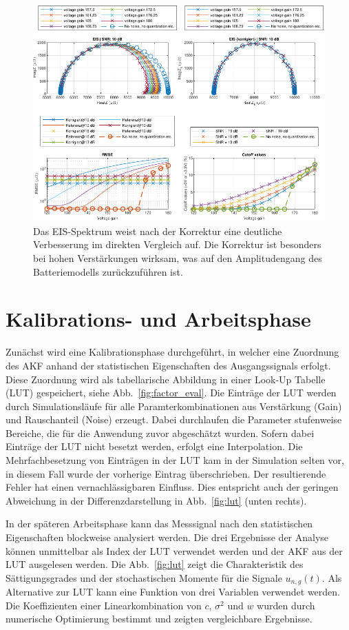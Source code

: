 \begin{figure}[t!]
	\centering
	\includegraphics[width=.9\textwidth]{../img/ergebnisse.pdf}
	\caption{Das EIS-Spektrum weist nach der Korrektur eine deutliche Verbesserung im direkten Vergleich auf. Die Korrektur ist besonders bei hohen Verstärkungen wirksam, was auf den Amplitudengang des Batteriemodells zurückzuführen ist.}
	\label{fig:Ergebnisse} 
\end{figure}

\section{Kalibrations- und Arbeitsphase}

Zunächst wird eine Kalibrationsphase durchgeführt, in welcher eine Zuordnung des AKF anhand der statistischen Eigenschaften des Ausgangssignals erfolgt. Diese Zuordnung wird als tabellarische Abbildung in einer Look-Up Tabelle (LUT) gespeichert, siehe Abb.~\ref{fig:factor_eval}. 
Die Einträge der LUT werden durch Simulationsläufe für alle Paramterkombinationen aus Verstärkung (Gain) und Rauschanteil (Noise) erzeugt. Dabei durchlaufen die Parameter stufenweise Bereiche, die für die Anwendung zuvor abgeschätzt wurden. Sofern dabei Einträge der LUT nicht besetzt werden, erfolgt eine Interpolation.
Die Mehrfachbesetzung von Einträgen in der LUT kam in der Simulation selten vor, in diesem Fall wurde der vorherige Eintrag überschrieben. Der resultierende Fehler hat einen vernachlässigbaren Einfluss. Dies entspricht auch der geringen Abweichung in der Differenzdarstellung in Abb.~\ref{fig:lut} (unten rechts). 

In der späteren Arbeitsphase kann das Messsignal nach den statistischen Eigenschaften blockweise analysiert werden. Die drei Ergebnisse der Analyse können unmittelbar als Index der LUT verwendet werden und der AKF aus der LUT ausgelesen werden. Die Abb.~\ref{fig:lut} zeigt die Charakteristik des Sättigungsgrades und der stochastischen Momente für die Signale $u_{n,g}(t)$. Als Alternative zur LUT kann eine Funktion von drei Variablen verwendet werden. Die Koeffizienten einer Linearkombination von $c$, $\sigma^2$ und $w$ wurden durch numerische Optimierung bestimmt und zeigten vergleichbare Ergebnisse.

